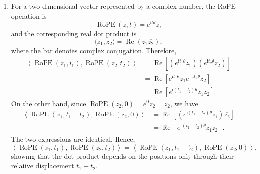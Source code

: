 \documentclass[11pt, a4paper, oneside]{article}
\begin{document}
\begin{enumerate}[label=(\alph*), left=0pt, labelsep=1em, itemsep=1em]
\begin{enumerate}[label=\roman*., left=0pt, labelsep=1em, itemsep=1em]
        \item
        For a two-dimensional vector represented by a complex number, the
        RoPE operation is
        \[
            \operatorname{RoPE}(z,t)=e^{\mathrm{i}t\theta}z,
        \]
        and the corresponding real dot product is
        \[
            \langle z_1,z_2\rangle
            =\operatorname{Re}\!\left(z_1\overline{z_2}\right),
        \]
        where the bar denotes complex conjugation. Therefore,
        \begin{align*}
            \left\langle \operatorname{RoPE}(z_1,t_1),
            \operatorname{RoPE}(z_2,t_2)\right\rangle
            &=\operatorname{Re}\!\left[
                \left(e^{\mathrm{i}t_1\theta}z_1\right)
                \overline{\left(e^{\mathrm{i}t_2\theta}z_2\right)}
              \right]\\
            &=\operatorname{Re}\!\left[
                e^{\mathrm{i}t_1\theta}z_1
                e^{-\mathrm{i}t_2\theta}\overline{z_2}
              \right]\\
            &=\operatorname{Re}\!\left[
                e^{\mathrm{i}(t_1-t_2)\theta}z_1\overline{z_2}
              \right].
        \end{align*}
        On the other hand, since
        $\operatorname{RoPE}(z_2,0)=e^{0}z_2=z_2$, we have
        \begin{align*}
            \left\langle \operatorname{RoPE}(z_1,t_1-t_2),
            \operatorname{RoPE}(z_2,0)\right\rangle
            &=\operatorname{Re}\!\left[
                \left(e^{\mathrm{i}(t_1-t_2)\theta}z_1\right)
                \overline{z_2}
              \right]\\
            &=\operatorname{Re}\!\left[
                e^{\mathrm{i}(t_1-t_2)\theta}z_1\overline{z_2}
              \right].
        \end{align*}
        The two expressions are identical. Hence,
        \[
            \left\langle \operatorname{RoPE}(z_1,t_1),
            \operatorname{RoPE}(z_2,t_2)\right\rangle
            =
            \left\langle \operatorname{RoPE}(z_1,t_1-t_2),
            \operatorname{RoPE}(z_2,0)\right\rangle,
        \]
        showing that the dot product depends on the positions only through
        their relative displacement $t_1-t_2$.
    \end{enumerate}
\end{enumerate}
\end{document}
